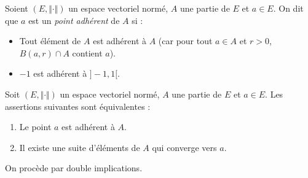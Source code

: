 \documentclass[french,11pt,twoside]{VcCours}
\begin{document}

\begin{Definition}{} 
Soient $(E, \Vert \cdot \Vert)$ un espace vectoriel normé, $A$ une partie de $E$ et $a \in E$. On dit que $a$ est un \emph{point adhérent} de $A$ si :
\vspace{1cm}
%
\end{Definition}

\begin{Remarques}{}
\begin{itemize} 
\item Tout élément de $A$ est adhérent à $A$ (car pour tout $a \in A$ et $r>0$, $B(a,r) \cap A$ contient $a$).
\item $-1$ est adhérent à $]-1,1[$.
\end{itemize}
\end{Remarques}{}

\begin{Proposition}{} Soit $(E, \Vert \cdot \Vert)$ un espace vectoriel normé, $A$ une partie de $E$ et $a \in E$. Les assertions suivantes sont équivalentes :

\begin{enumerate}
\item Le point $a$ est adhérent à $A$.
\item Il existe une suite d'éléments de $A$ qui converge vers $a$.
\end{enumerate}
\end{Proposition}

\begin{Demonstration}{} On procède par double implications.
%
%
%

\vspace{10cm}
\end{Demonstration}
\end{document}
